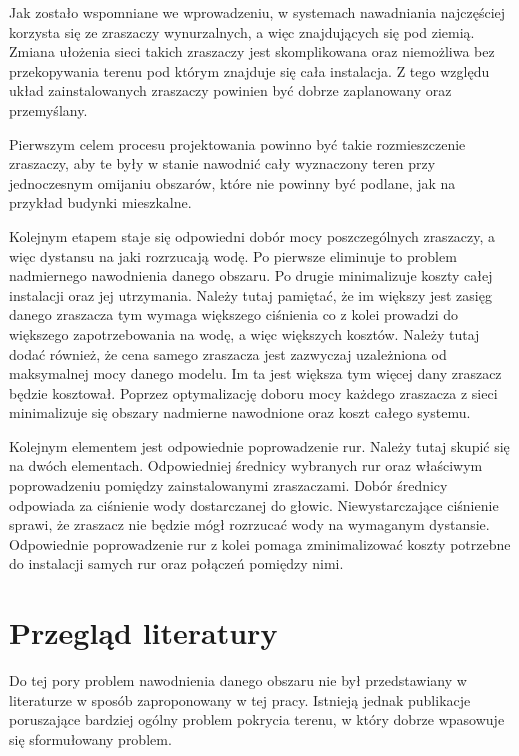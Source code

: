 \documentclass[twoside]{iisthesis}
\begin{document}
Jak zostało wspomniane we wprowadzeniu, w systemach nawadniania najczęściej korzysta się ze zraszaczy wynurzalnych, a więc znajdujących się pod ziemią. Zmiana ułożenia sieci takich zraszaczy jest skomplikowana oraz niemożliwa bez przekopywania terenu pod którym znajduje się cała instalacja. Z tego względu układ zainstalowanych zraszaczy powinien być dobrze zaplanowany oraz przemyślany.

Pierwszym celem procesu projektowania powinno być takie rozmieszczenie zraszaczy, aby te były w stanie nawodnić cały wyznaczony teren przy jednoczesnym omijaniu obszarów, które nie powinny być podlane, jak na przykład budynki mieszkalne.

Kolejnym etapem staje się odpowiedni dobór mocy poszczególnych zraszaczy, a więc dystansu na jaki rozrzucają wodę. Po pierwsze eliminuje to problem nadmiernego nawodnienia danego obszaru. Po drugie minimalizuje koszty całej instalacji oraz jej utrzymania. Należy tutaj pamiętać, że im większy jest zasięg danego zraszacza tym wymaga większego ciśnienia co z kolei prowadzi do większego zapotrzebowania na wodę, a więc większych kosztów. Należy tutaj dodać również, że cena samego zraszacza jest zazwyczaj uzależniona od maksymalnej mocy danego modelu. Im ta jest większa tym więcej dany zraszacz będzie kosztował. Poprzez optymalizację doboru mocy każdego zraszacza z sieci minimalizuje się obszary nadmierne nawodnione oraz koszt całego systemu.

Kolejnym elementem jest odpowiednie poprowadzenie rur. Należy tutaj skupić się na dwóch elementach. Odpowiedniej średnicy wybranych rur oraz właściwym poprowadzeniu pomiędzy zainstalowanymi zraszaczami. Dobór średnicy odpowiada za ciśnienie wody dostarczanej do głowic. Niewystarczające ciśnienie sprawi, że zraszacz nie będzie mógł rozrzucać wody na wymaganym dystansie. Odpowiednie poprowadzenie rur z kolei pomaga zminimalizować koszty potrzebne do instalacji samych rur oraz połączeń pomiędzy nimi.

\section{Przegląd literatury}
Do tej pory problem nawodnienia danego obszaru nie był przedstawiany w literaturze w sposób zaproponowany w tej pracy. Istnieją jednak publikacje poruszające bardziej ogólny problem pokrycia terenu, w który dobrze wpasowuje się sformułowany problem.
\end{document}
